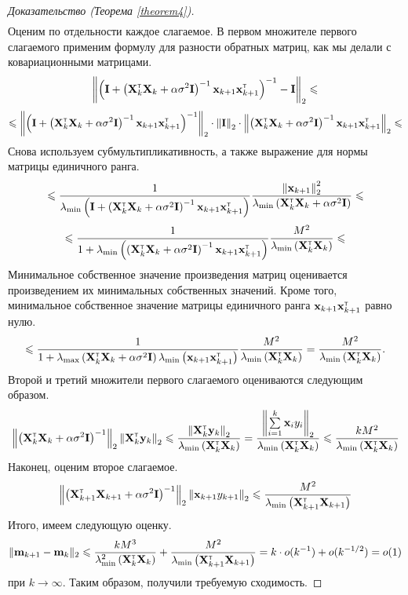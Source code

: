\begin{proof}[Доказательство (Теорема \ref{theorem4})]
\begin{multline*}
    \end{multline*}
    Оценим по отдельности каждое слагаемое. В первом множителе первого слагаемого применим формулу для разности обратных матриц, как мы делали с ковариационными матрицами.
    \[ \left\| \left( \bI + \left( \bX_k\T \bX_k + \alpha \sigma^2 \bI \right)^{-1} \bx_{k+1} \bx_{k+1}\T \right)^{-1} - \bI \right\|_2 \leqslant \]
    \[ \leqslant \left\| \left( \bI + \left( \bX_k\T \bX_k + \alpha \sigma^2 \bI \right)^{-1} \bx_{k+1} \bx_{k+1}\T \right)^{-1} \right\|_2 \cdot \left\| \bI \right\|_2 \cdot \left\| \left( \bX_k\T \bX_k + \alpha \sigma^2 \bI \right)^{-1} \bx_{k+1} \bx_{k+1}\T \right\|_2 \leqslant \]
    Снова используем субмультипликативность, а также выражение для нормы матрицы единичного ранга.
    \[ \leqslant \dfrac{1}{\lambda_{\min}\left( \bI + \left( \bX_k\T \bX_k + \alpha \sigma^2 \bI \right)^{-1} \bx_{k+1} \bx_{k+1}\T \right)} \dfrac{\left\| \bx_{k+1} \right\|_2^2}{\lambda_{\min}\left( \bX_k\T \bX_k + \alpha \sigma^2 \bI \right)} \leqslant \]
    \[ \leqslant \dfrac{1}{1 + \lambda_{\min}\left(\left( \bX_k\T \bX_k + \alpha \sigma^2 \bI \right)^{-1} \bx_{k+1} \bx_{k+1}\T \right)} \dfrac{M^2}{\lambda_{\min}\left( \bX_k\T \bX_k \right)} \leqslant \]
    Минимальное собственное значение произведения матриц оценивается произведением их минимальных собственных значений. Кроме того, минимальное собственное значение матрицы единичного ранга $\bx_{k+1} \bx_{k+1}\T$ равно нулю.
    \[ \leqslant \dfrac{1}{1 + \lambda_{\max}\left( \bX_k\T \bX_k + \alpha \sigma^2 \bI \right) \lambda_{\min}\left( \bx_{k+1} \bx_{k+1}\T \right)} \dfrac{M^2}{\lambda_{\min}\left( \bX_k\T \bX_k \right)} = \dfrac{M^2}{\lambda_{\min}\left( \bX_k\T \bX_k \right)}. \]
    Второй и третий множители первого слагаемого оцениваются следующим образом.
    \[ \left\| \left( \bX_k\T \bX_k + \alpha \sigma^2 \bI \right)^{-1} \right\|_2 \left\| \bX_k\T \by_k \right\|_2 \leqslant \dfrac{\left\| \bX_k\T \by_k \right\|_2}{\lambda_{\min}\left( \bX_k\T \bX_k \right)} = \dfrac{\left\| \sum\limits_{i=1}^{k} \bx_i y_i \right\|_2}{\lambda_{\min}\left( \bX_k\T \bX_k \right)} \leqslant \dfrac{k M^2}{\lambda_{\min}\left( \bX_k\T \bX_k \right)} \]
    Наконец, оценим второе слагаемое.
    \[ \left\| \left( \bX_{k+1}\T \bX_{k+1} + \alpha \sigma^2 \bI \right)^{-1} \right\|_2 \left\| \bx_{k+1} y_{k+1} \right\|_2 \leqslant \dfrac{M^2}{\lambda_{\min}\left( \bX_{k+1}\T \bX_{k+1} \right)} \]
    Итого, имеем следующую оценку.
    \[ \| \bm_{k+1} - \bm_k \|_2 \leqslant \dfrac{k M^3}{\lambda_{\min}^2\left( \bX_k\T \bX_k \right)} + \dfrac{M^2}{\lambda_{\min}\left( \bX_{k+1}\T \bX_{k+1} \right)} = k \cdot o(k^{-1}) + o(k^{-1/2}) = o(1) \]
    при $k \to \infty$. Таким образом, получили требуемую сходимость.
\end{proof}


